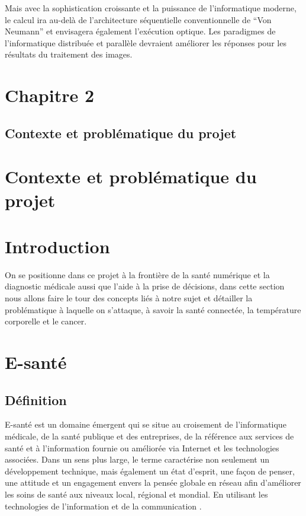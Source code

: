 \documentclass[12pt]{article}
\begin{document}
Mais avec la sophistication croissante et la puissance de l'informatique moderne, le calcul ira au-delà de l'architecture séquentielle conventionnelle de “Von Neumann” et envisagera également l'exécution optique. Les paradigmes de l'informatique distribuée et parallèle devraient améliorer les réponses pour les résultats du traitement des images.
\newpage
\rhead{}
\section*{\Huge{Chapitre 2}}
\subsection*{\huge{Contexte et problématique du projet}}
\newpage
{}
\section*{Contexte et problématique du projet}
\section{Introduction}
On se positionne dans ce projet à la frontière de la santé numérique et la diagnostic médicale aussi que l'aide à la prise de décisions, dans cette section nous allons faire le tour des concepts liés à notre sujet et détailler la problématique à laquelle on s'attaque, à savoir la santé connectée, la température corporelle et le cancer.  
\section{E-santé}
\subsection{Définition}
E-santé est un domaine émergent qui se situe au croisement de l'informatique médicale, de la santé publique et des entreprises, de la référence aux services de santé et à l'information fournie ou améliorée via Internet et les technologies associées. Dans un sens plus large, le terme caractérise non seulement un développement technique, mais également un état d'esprit, une façon de penser, une attitude et un engagement envers la pensée globale en réseau afin d'améliorer les soins de santé aux niveaux local, régional et mondial. En utilisant les technologies de l'information et de la communication \cite{26}.
\end{document}
